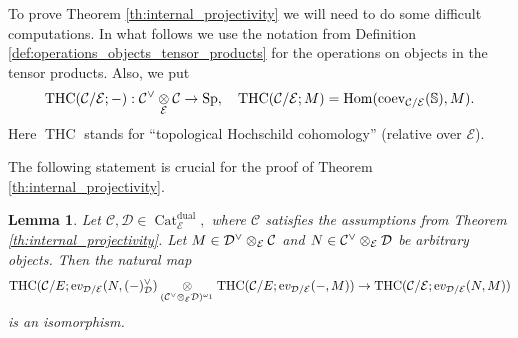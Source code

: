 \documentclass[11pt,leqno]{amsart}
\newtheorem{lemma}[theo]{Lemma}
\numberwithin{equation}{section}
\def\bS{\mathbb{S}}
\def\Hom{\operatorname{Hom}}
\newcommand{\tens}[1]{%
  \mathbin{\mathop{\otimes}\displaylimits_{#1}}%
}
\newcommand{\Cat}{\operatorname{Cat}}
\newcommand{\dual}{\operatorname{dual}}
\newcommand{\ev}{\mathrm ev}
\newcommand{\cD}{{\mathcal D}}
\newcommand{\cC}{{\mathcal C}}
\newcommand{\cE}{{\mathcal E}}
\newcommand{\THC}{\operatorname{THC}}
\newcommand{\Sp}{\operatorname{Sp}}
\newcommand{\coev}{\operatorname{coev}}
\begin{document}
To prove Theorem \ref{th:internal_projectivity} we will need to do some difficult computations. In what follows we use the notation from Definition \ref{def:operations_objects_tensor_products} for the operations on objects in the tensor products. Also, we put 
\begin{equation*}
	\THC(\cC/\cE;-):\cC^{\vee}\tens{\cE}\cC\to\Sp,\quad \THC(\cC/\cE;M)=\Hom(\coev_{\cC/\cE}(\bS),M).
\end{equation*}
Here $\THC$ stands for ``topological Hochschild cohomology'' (relative over $\cE$).

The following statement is crucial for the proof of Theorem \ref{th:internal_projectivity}. 

\begin{lemma}\label{lem:key_lemma_on_crazy_product}
Let $\cC,\cD\in\Cat_{\cE}^{\dual},$ where $\cC$ satisfies the assumptions from Theorem \ref{th:internal_projectivity}. Let $M\in\cD^{\vee}\tens{\cE}\cC$ and $N\in\cC^{\vee}\tens{\cE}\cD$ be arbitrary objects. Then the natural map
\begin{equation}\label{eq:crazy_tensor_product}
\THC(\cC/E;\ev_{\cD/\cE}(N,(-)_{\cD}^{\vee})\tens{(\cC^{\vee}\tens{\cE}\cD)^{\omega_1}} \THC(\cC/E;\ev_{\cD/\cE}(-,M))\to \THC(\cC/\cE;\ev_{\cD/\cE}(N,M))\end{equation}  is an isomorphism. 	
\end{lemma} 
\end{document}
